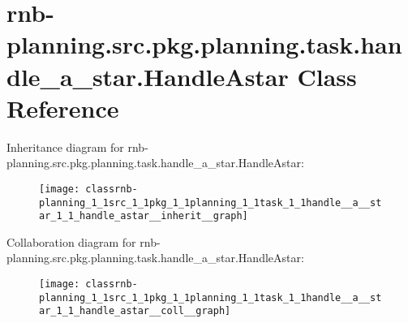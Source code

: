 \hypertarget{classrnb-planning_1_1src_1_1pkg_1_1planning_1_1task_1_1handle__a__star_1_1_handle_astar}{}\section{rnb-\/planning.src.\+pkg.\+planning.\+task.\+handle\+\_\+a\+\_\+star.\+Handle\+Astar Class Reference}
\label{classrnb-planning_1_1src_1_1pkg_1_1planning_1_1task_1_1handle__a__star_1_1_handle_astar}


Inheritance diagram for rnb-\/planning.src.\+pkg.\+planning.\+task.\+handle\+\_\+a\+\_\+star.\+Handle\+Astar\+:
\nopagebreak
\begin{figure}[H]
\begin{center}
\leavevmode
\texttt{[image: classrnb-planning\_1\_1src\_1\_1pkg\_1\_1planning\_1\_1task\_1\_1handle\_\_a\_\_star\_1\_1\_handle\_astar\_\_inherit\_\_graph]}
\end{center}
\end{figure}


Collaboration diagram for rnb-\/planning.src.\+pkg.\+planning.\+task.\+handle\+\_\+a\+\_\+star.\+Handle\+Astar\+:
\nopagebreak
\begin{figure}[H]
\begin{center}
\leavevmode
\texttt{[image: classrnb-planning\_1\_1src\_1\_1pkg\_1\_1planning\_1\_1task\_1\_1handle\_\_a\_\_star\_1\_1\_handle\_astar\_\_coll\_\_graph]}
\end{center}
\end{figure}
